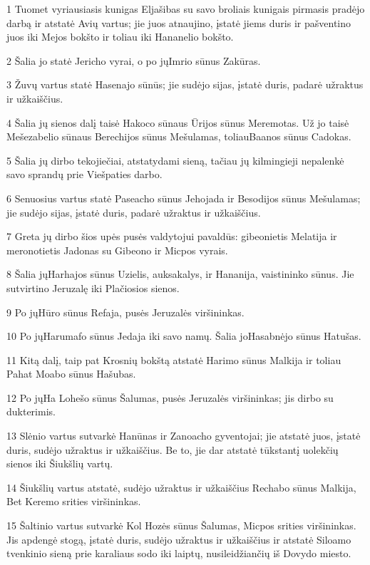\par 1 Tuomet vyriausiasis kunigas Eljašibas su savo broliais kunigais pirmasis pradėjo darbą ir atstatė Avių vartus; jie juos atnaujino, įstatė jiems duris ir pašventino juos iki Mejos bokšto ir toliau iki Hananelio bokšto. 
\par 2 Šalia jo statė Jericho vyrai, o po jų­Imrio sūnus Zakūras. 
\par 3 Žuvų vartus statė Hasenajo sūnūs; jie sudėjo sijas, įstatė duris, padarė užraktus ir užkaiščius. 
\par 4 Šalia jų sienos dalį taisė Hakoco sūnaus Ūrijos sūnus Meremotas. Už jo taisė Mešezabelio sūnaus Berechijos sūnus Mešulamas, toliau­Baanos sūnus Cadokas. 
\par 5 Šalia jų dirbo tekojiečiai, atstatydami sieną, tačiau jų kilmingieji nepalenkė savo sprandų prie Viešpaties darbo. 
\par 6 Senuosius vartus statė Paseacho sūnus Jehojada ir Besodijos sūnus Mešulamas; jie sudėjo sijas, įstatė duris, padarė užraktus ir užkaiščius. 
\par 7 Greta jų dirbo šios upės pusės valdytojui pavaldūs: gibeonietis Melatija ir meronotietis Jadonas su Gibeono ir Micpos vyrais. 
\par 8 Šalia jų­Harhajos sūnus Uzielis, auksakalys, ir Hananija, vaistininko sūnus. Jie sutvirtino Jeruzalę iki Plačiosios sienos. 
\par 9 Po jų­Hūro sūnus Refaja, pusės Jeruzalės viršininkas. 
\par 10 Po jų­Harumafo sūnus Jedaja iki savo namų. Šalia jo­Hasabnėjo sūnus Hatušas. 
\par 11 Kitą dalį, taip pat Krosnių bokštą atstatė Harimo sūnus Malkija ir toliau Pahat Moabo sūnus Hašubas. 
\par 12 Po jų­Ha Lohešo sūnus Šalumas, pusės Jeruzalės viršininkas; jis dirbo su dukterimis. 
\par 13 Slėnio vartus sutvarkė Hanūnas ir Zanoacho gyventojai; jie atstatė juos, įstatė duris, sudėjo užraktus ir užkaiščius. Be to, jie dar atstatė tūkstantį uolekčių sienos iki Šiukšlių vartų. 
\par 14 Šiukšlių vartus atstatė, sudėjo užraktus ir užkaiščius Rechabo sūnus Malkija, Bet Keremo srities viršininkas. 
\par 15 Šaltinio vartus sutvarkė Kol Hozės sūnus Šalumas, Micpos srities viršininkas. Jis apdengė stogą, įstatė duris, sudėjo užraktus ir užkaiščius ir atstatė Siloamo tvenkinio sieną prie karaliaus sodo iki laiptų, nusileidžiančių iš Dovydo miesto. 
